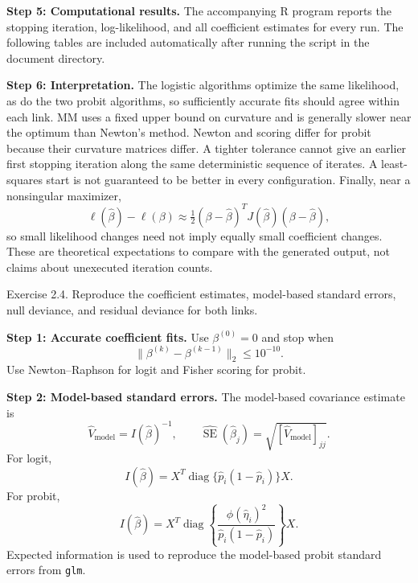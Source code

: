 \documentclass[answers,12pt,addpoints]{exam}
\begin{document}
\begin{questions}
\begin{solution}
\textbf{Step 5: Computational results.}
The accompanying R program reports the stopping iteration, log-likelihood,
and all coefficient estimates for every run. The following tables are
included automatically after running the script in the document directory.

\textbf{Step 6: Interpretation.}
The logistic algorithms optimize the same likelihood, as do the two probit
algorithms, so sufficiently accurate fits should agree within each link.
MM uses a fixed upper bound on curvature and is generally slower near the
optimum than Newton's method. Newton and scoring differ for probit because
their curvature matrices differ. A tighter tolerance cannot give an earlier
first stopping iteration along the same deterministic sequence of iterates.
A least-squares start is not guaranteed to be better in every configuration.
Finally, near a nonsingular maximizer,
\[
\ell(\widehat\beta)-\ell(\beta)
\approx\tfrac12(\beta-\widehat\beta)^TJ(\widehat\beta)
(\beta-\widehat\beta),
\]
so small likelihood changes need not imply equally small coefficient changes.
These are theoretical expectations to compare with the generated output,
not claims about unexecuted iteration counts.
\end{solution}

\question Exercise 2.4. Reproduce the coefficient estimates, model-based
standard errors, null deviance, and residual deviance for both links.
\begin{solution}
\textbf{Step 1: Accurate coefficient fits.}
Use $\beta^{(0)}=0$ and stop when
\[
\|\beta^{(k)}-\beta^{(k-1)}\|_2\leq10^{-10}.
\]
Use Newton--Raphson for logit and Fisher scoring for probit.

\textbf{Step 2: Model-based standard errors.}
The model-based covariance estimate is
\[
\widehat V_{\mathrm{model}}=I(\widehat\beta)^{-1},\qquad
\widehat{\operatorname{SE}}(\widehat\beta_j)
=\sqrt{[\widehat V_{\mathrm{model}}]_{jj}}.
\]
For logit,
\[
I(\widehat\beta)=X^T\operatorname{diag}
\{\widehat p_i(1-\widehat p_i)\}X.
\]
For probit,
\[
I(\widehat\beta)=X^T\operatorname{diag}
\left\{\frac{\phi(\widehat\eta_i)^2}
{\widehat p_i(1-\widehat p_i)}\right\}X.
\]
Expected information is used to reproduce the model-based probit standard
errors from \texttt{glm}.


\end{solution}
\end{questions}
\end{document}
